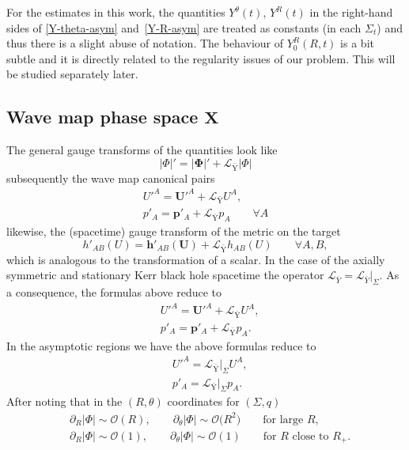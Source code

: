 \documentclass[pdftex]{sigma}
\def\ptl{\partial}%
\def\mbo#1{\boldsymbol{#1}}%
\numberwithin{equation}{section}
\begin{document}
For the estimates in this work, the quantities $Y^\theta (t)$, $Y^R (t) $ in the right-hand sides of \eqref{Y-theta-asym} and~\eqref{Y-R-asym} are treated as constants (in each $\Sigma_t$) and thus there is a slight abuse of notation. The behaviour of $Y^R_0 (R, t)$ is a bit subtle and it is directly related to the regularity issues of our problem. This will be studied separately later.

\subsection*{Wave map phase space $\boldsymbol{X}$}
The general gauge transforms of the quantities
look like
\[
\vert \Phi \vert' = \vert \mbo{\Phi} \vert' + \mathcal{L}_{\bar{\text{Y}}}\vert \Phi \vert
\]
subsequently the wave map canonical pairs
\begin{gather*}
U'^A = \mbo{U}'^A + \mathcal{L}_{\bar{\text{Y}}} U^A, \\
p'_A = \mbo{p}'_A + \mathcal{L}_{\bar{\text{Y}}} p_A \qquad \forall A
\end{gather*}
likewise, the (spacetime) gauge transform of the metric on the target
\[
h'_{AB} (U)= \mbo{h}'_{AB} (\mbo{U}) + \mathcal{L}_{\bar{\text{Y}}} h_{AB}(U) \qquad \forall A, B,
\]
which is analogous to the transformation of a scalar.
In the case of the axially symmetric and stationary Kerr black hole spacetime the operator $\mathcal{L}_{\bar{Y}} = \mathcal{L}_{\bar{Y}} \vert_{\Sigma}$. As a consequence, the formulas above reduce to
\begin{align*}
& U'^A= \mbo{U}'^A +\mathcal{L}_{\bar{\text{Y}}} U^A, \\
& p'_A= \mbo{p}'_A + \mathcal{L}_{\bar{\text{Y}}} p_A.
 \end{align*}
In the asymptotic regions we have the above formulas reduce to
\begin{align*}
&U'^A= \mathcal{L}_{\bar{\text{Y}}}\vert_{\Sigma} U^A, \\
&p'_A= \mathcal{L}_{\bar{\text{Y}}}\vert_{\Sigma} p_A.
\end{align*}
After noting that in the $(R, \theta)$ coordinates for $(\Sigma, q)$
\begin{align*}
&\ptl_R \vert \Phi \vert \sim \mathcal{O}(R), \qquad \ptl_\theta \vert \Phi \vert \sim \mathcal{O}\bigl(R^2\bigr) \qquad \text{for large $R$} , \\
& \ptl_R \vert \Phi \vert \sim \mathcal{O}(1), \qquad \ptl_\theta \vert \Phi \vert \sim \mathcal{O}(1) \qquad \text{for $R$ close to $R_+$}.
\end{align*}
\end{document}
